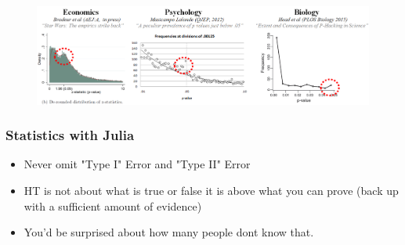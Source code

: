 \documentclass[Master.tex]{subfiles}
\begin{document}
\begin{frame}
	\begin{figure}
\centering
\includegraphics[width=1.1\linewidth]{images/phacking}
\caption{}
\label{fig:phacking}
\end{figure}

\end{frame}	
\begin{frame}
	\frametitle{Statistics with Julia}
	\large
	\begin{itemize}
	\item Never omit "Type I" Error and "Type II" Error
	
	\item HT is not about what is true or false it is above what you can prove (back up with a sufficient amount of evidence)
	
	\item You'd be surprised about how many people dont know that.
	\end{itemize}
\end{frame}
\end{document}
